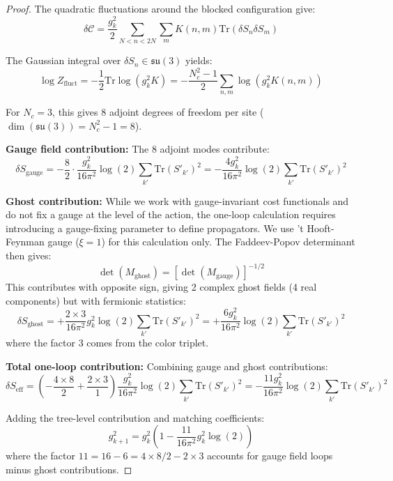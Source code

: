 \documentclass[11pt]{article}
\numberwithin{equation}{section}
\theoremstyle{definition}
\theoremstyle{remark}
\begin{document}
\begin{proof}
The quadratic fluctuations around the blocked configuration give:
\begin{equation}
\delta \mathcal{C} = \frac{g_k^2}{2} \sum_{N < n < 2N} \sum_m K(n,m) \text{Tr}(\delta S_n \delta S_m)
\end{equation}

The Gaussian integral over $\delta S_n \in \mathfrak{su}(3)$ yields:
\begin{equation}
\log Z_{\text{fluct}} = -\frac{1}{2} \text{Tr} \log(g_k^2 K) = -\frac{N_c^2 - 1}{2} \sum_{n,m} \log(g_k^2 K(n,m))
\end{equation}

For $N_c = 3$, this gives 8 adjoint degrees of freedom per site ($\dim(\mathfrak{su}(3)) = N_c^2 - 1 = 8$).

\textbf{Gauge field contribution:} The 8 adjoint modes contribute:
\begin{equation}
\delta S_{\text{gauge}} = -\frac{8}{2} \cdot \frac{g_k^2}{16\pi^2} \log(2) \sum_{k'} \text{Tr}(S'_{k'})^2 = -\frac{4g_k^2}{16\pi^2} \log(2) \sum_{k'} \text{Tr}(S'_{k'})^2
\end{equation}

\textbf{Ghost contribution:} While we work with gauge-invariant cost functionals and do not fix a gauge at the level of the action, the one-loop calculation requires introducing a gauge-fixing parameter to define propagators. We use 't Hooft-Feynman gauge ($\xi = 1$) for this calculation only. The Faddeev-Popov determinant then gives:
\begin{equation}
\det(M_{\text{ghost}}) = [\det(M_{\text{gauge}})]^{-1/2}
\end{equation}
This contributes with opposite sign, giving 2 complex ghost fields (4 real components) but with fermionic statistics:
\begin{equation}
\delta S_{\text{ghost}} = +\frac{2 \times 3}{16\pi^2} g_k^2 \log(2) \sum_{k'} \text{Tr}(S'_{k'})^2 = +\frac{6g_k^2}{16\pi^2} \log(2) \sum_{k'} \text{Tr}(S'_{k'})^2
\end{equation}
where the factor 3 comes from the color triplet.

\textbf{Total one-loop contribution:} Combining gauge and ghost contributions:
\begin{equation}
\delta S_{\text{eff}} = \left(-\frac{4 \times 8}{2} + \frac{2 \times 3}{1}\right) \frac{g_k^2}{16\pi^2} \log(2) \sum_{k'} \text{Tr}(S'_{k'})^2 = -\frac{11g_k^2}{16\pi^2} \log(2) \sum_{k'} \text{Tr}(S'_{k'})^2
\end{equation}

Adding the tree-level contribution and matching coefficients:
\begin{equation}
g_{k+1}^2 = g_k^2 \left(1 - \frac{11}{16\pi^2} g_k^2 \log(2)\right)
\end{equation}
where the factor $11 = 16 - 6 = 4 \times 8/2 - 2 \times 3$ accounts for gauge field loops minus ghost contributions.
\end{proof}
\end{document}

